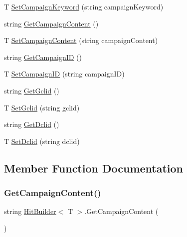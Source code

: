 \begin{DoxyCompactItemize}
\item 
T \hyperlink{class_hit_builder_a2af536899c9cfabd3dfb6264d5820390}{Set\+Campaign\+Keyword} (string campaign\+Keyword)
\item 
string \hyperlink{class_hit_builder_a6d424401864e382a172b8c774fd7e466}{Get\+Campaign\+Content} ()
\item 
T \hyperlink{class_hit_builder_afae82d6b7728f406b6ae074d804f6877}{Set\+Campaign\+Content} (string campaign\+Content)
\item 
string \hyperlink{class_hit_builder_aaf708a2c92535d81c8a5c04f979e00a7}{Get\+Campaign\+ID} ()
\item 
T \hyperlink{class_hit_builder_a769c78dab9c56eb9aece4bd2388c019f}{Set\+Campaign\+ID} (string campaign\+ID)
\item 
string \hyperlink{class_hit_builder_aed45644b41067f6c82655f127b4edd8e}{Get\+Gclid} ()
\item 
T \hyperlink{class_hit_builder_a2955d4278dea7ae27067f1b7ec053e77}{Set\+Gclid} (string gclid)
\item 
string \hyperlink{class_hit_builder_aa6bfa35c9084719f372002d2762aca39}{Get\+Dclid} ()
\item 
T \hyperlink{class_hit_builder_a80be85c68138279996d755db2f2e0416}{Set\+Dclid} (string dclid)
\end{DoxyCompactItemize}


\subsection{Member Function Documentation}
\mbox{\label{class_hit_builder_a6d424401864e382a172b8c774fd7e466}} 
\subsubsection{\texorpdfstring{Get\+Campaign\+Content()}{GetCampaignContent()}}
{\footnotesize\ttfamily string \hyperlink{class_hit_builder}{Hit\+Builder}$<$ T $>$.Get\+Campaign\+Content (\begin{DoxyParamCaption}{ }\end{DoxyParamCaption})}

\mbox{\label{class_hit_builder_aaf708a2c92535d81c8a5c04f979e00a7}} 

